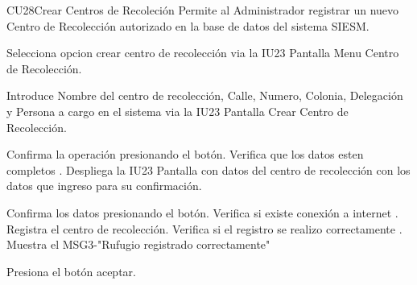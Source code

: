 \begin{UseCase}{CU28}{Crear Centros de Recoleción}{
		Permite al Administrador registrar un nuevo Centro de Recolección autorizado en la base de datos del sistema SIESM.\\
		
}
	
\end{UseCase}



\begin{UCtrayectoria}
	\item\UCactor Selecciona opcion crear centro de recolección via la IU23 Pantalla Menu Centro de Recolección.
	\item\UCactor Introduce Nombre del centro de recolección, Calle, Numero, Colonia, Delegación y Persona a cargo en el sistema via la IU23 Pantalla Crear Centro de Recolección.
	\item\UCactor Confirma la operación presionando el botón.
	\UCpaso Verifica que los datos esten completos .
	\UCpaso Despliega la IU23 Pantalla con datos del centro de recolección con los datos que ingreso para su confirmación.
	\item\UCactor Confirma los datos presionando el botón.
	\UCpaso Verifica si existe conexión a internet .
	\UCpaso Registra el centro de recolección.
	\UCpaso Verifica si el registro se realizo correctamente .
	\UCpaso Muestra el MSG3-"Rufugio registrado correctamente"
	\item\UCactor Presiona el botón aceptar.
\end{UCtrayectoria}


